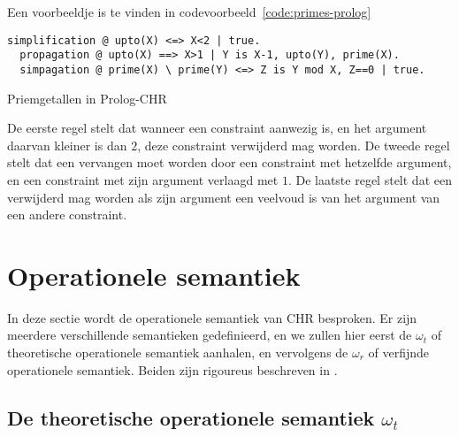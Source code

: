 Een voorbeeldje is te vinden in codevoorbeeld~\ref{code:primes-prolog}
\begin{exCode}[bp]
\begin{Verbatim}[frame=single]
  simplification @ upto(X) <=> X<2 | true.
  propagation @ upto(X) ==> X>1 | Y is X-1, upto(Y), prime(X).
  simpagation @ prime(X) \ prime(Y) <=> Z is Y mod X, Z==0 | true.
\end{Verbatim}
\caption{Priemgetallen in Prolog-CHR}
\label{code:primes-prolog}
\end{exCode}
De eerste regel stelt dat wanneer een  constraint aanwezig is, en het argument daarvan kleiner is dan $2$, deze constraint verwijderd mag worden. De tweede regel stelt dat een  vervangen moet worden door een  constraint met hetzelfde argument, en een  constraint met zijn argument verlaagd met $1$. De laatste regel stelt dat een  verwijderd mag worden als zijn argument een veelvoud is van het argument van een andere  constraint.

\section{Operationele semantiek}

In deze sectie wordt de operationele semantiek van CHR besproken. Er zijn meerdere verschillende semantieken gedefinieerd, en we zullen hier eerst de $\omega_t$ of theoretische operationele semantiek aanhalen, en vervolgens de $\omega_r$ of verfijnde operationele semantiek. Beiden zijn rigoureus beschreven in \cite{refined}.

\subsection{De theoretische operationele semantiek $\omega_t$}

